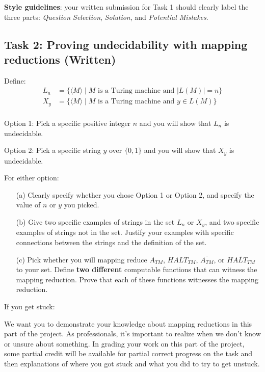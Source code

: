 \documentclass[12pt, oneside]{article}
\begin{document}
	{\bf Style guidelines}: your written submission for Task 1 should clearly label the three parts:
	{\it Question Selection}, {\it Solution},  and {\it Potential Mistakes}.

\subsection*{Task 2: Proving undecidability with mapping reductions (Written)}

	Define:
	\begin{align*}
		L_n &= \{ \langle M \rangle \mid \textrm{$M$ is a Turing machine and } |L(M)| = n\} \\
		X_{y} & = \{ \langle M \rangle \mid \textrm{$M$ is a Turing machine and } y \in L(M)\} \\
	\end{align*}

	Option 1: Pick a specific positive integer $n$ and you will show that $L_n$ is undecidable.

	Option 2: Pick a specific string $y$ over $\{0,1\}$ and you will show that $X_y$ is undecidable.

	For either option:
	\begin{enumerate}
		\item[(a)] Clearly specify whether you chose Option 1 or Option 2, and specify the value of $n$ or $y$ you picked.
		\item[(b)] Give two specific examples of strings in the set $L_n$ or $X_y$, and two specific examples 
		of strings not in the set. Justify your examples with specific connections between the strings and the 
		definition of the set.
		\item[(c)] Pick whether you will mapping reduce $A_{TM}$, $HALT_{TM}$, $\overline{A_{TM}}$, or $\overline{HALT_{TM}}$
		to your set. Define {\bf two different} computable functions that can witness the mapping reduction.
		Prove that each of these functions witnesses the mapping reduction.
	\end{enumerate}

	If you get stuck:

	We want you to demonstrate your knowledge about mapping reductions in this part of the project.  
	As professionals, it's important to realize when we don't know or unsure about something.
	In grading your work on this part of the project, some partial credit will be available for 
	partial correct progress on the task and then explanations of where
	you got stuck and what you did to try to get unstuck.
\end{document}
